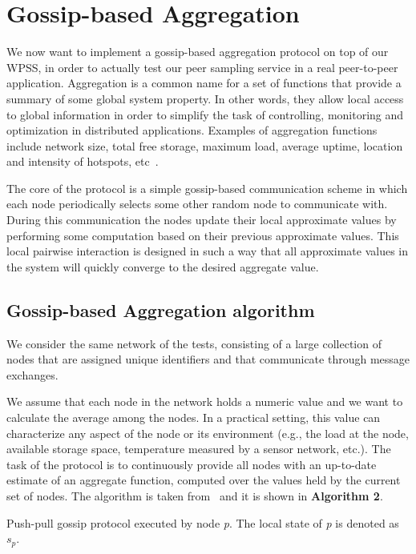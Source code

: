 
\chapter{Gossip-based Aggregation}
\label{cha:aggregation}
We now want to implement a gossip-based aggregation protocol on top of our WPSS, in order to actually test our peer sampling service in a real peer-to-peer application. Aggregation is a common name for a set of functions that provide a summary of some global system property. In other words, they allow local access to global information in order to simplify the task of controlling, monitoring and optimization in distributed applications. Examples of aggregation functions include network size, total free storage, maximum load, average uptime, location and intensity of hotspots, etc~\cite{aggregation}. 

The core of the protocol is a simple gossip-based communication scheme in which each node periodically selects some other random node to communicate with. During this communication the nodes update their local approximate values by performing some computation based on their previous approximate values. This local pairwise interaction is designed in such a way that all approximate values in the system will quickly converge to the desired aggregate value. 

\section{Gossip-based Aggregation algorithm}
We consider the same network of the tests, consisting of a large collection of nodes that are assigned unique identifiers and that communicate through message exchanges. 

We assume that each node in the network holds a numeric value and we want to calculate the average among the nodes. In a practical setting, this value can characterize any aspect of the node or its environment (e.g., the load at the node, available storage space, temperature measured by a sensor network, etc.). The task of the protocol is to continuously provide all nodes with an up-to-date estimate of an aggregate function, computed over the values held by the current set of nodes. The algorithm is taken from~\cite{aggregation} and it is shown in \textbf{Algorithm 2}.

\begin{algorithm}[H]




 \caption{Push-pull gossip protocol executed by node \textit{p}. The local state of \textit{p} is denoted as $s_p$.}
\end{algorithm}

